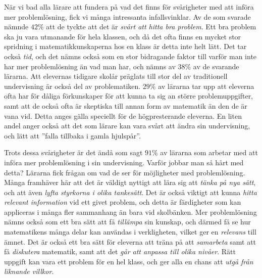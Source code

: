 \textcolor{lila}{När vi bad alla lärare att fundera på vad det finns för svårigheter med att införa mer problemlösning, fick vi många intressanta infallsvinklar. Av de som svarade nämnde $42\%$ att de tyckte att det är \textsl{svårt att hitta bra problem}. Ett bra problem ska ju vara utmanande för hela klassen, och då det ofta finns en mycket stor spridning i matematikkunskaperna hos en klass är detta inte helt lätt. Det tar också \textsl{tid}, och det nämns också som en stor bidragande faktor till varför man inte har mer problemlösning än vad man har, och nämns av $38\%$ av de svarande lärarna. Att elevernas tidigare skolår präglats till stor del av traditionell undervisning är också del av problematiken. $29\%$ av lärarna tar upp att eleverna ofta har för dåliga förkunskaper för att kunna ta sig an större problemuppgifter, samt att de också ofta är skeptiska till annan form av matematik än den de  är vana vid. Detta anges gälla speciellt för de högpresterande eleverna. En liten andel anger också att det som lärare kan vara svårt att ändra sin undervisning, och lätt att ''falla tillbaka i gamla hjulspår''.}

\textcolor{lila}{Trots dessa svårigheter är det ändå som sagt $91\%$ av lärarna som arbetar med att införa mer problemlösning i sin undervisning. Varför jobbar man så hårt med detta? Lärarna fick frågan om vad de ser för möjligheter med problemlösning. Många framhäver här att det är väldigt nyttigt att lära sig att \textsl{tänka på nya sätt}, och att även \textsl{lyfta styrkorna i olika tankesätt}. Det är också viktigt att kunna \textsl{hitta relevant information} vid ett givet problem, och detta är färdigheter som kan appliceras i många fler sammanhang än bara vid skolbänken. Mer problemlösning nämns också som ett bra sätt att få \textsl{tillämpa} sin kunskap, och därmed få se hur matematikens många delar kan användas i verkligheten, vilket ger en \textsl{relevans} till ämnet. Det är också ett bra sätt för eleverna att träna på att \textsl{samarbeta} samt att få \textsl{diskutera} matematik, samt att det \textsl{går att anpassa till olika nivåer}. Rätt uppgift kan vara ett problem för en hel klass, och ger alla en chans att \textsl{utgå från liknande villkor}.}